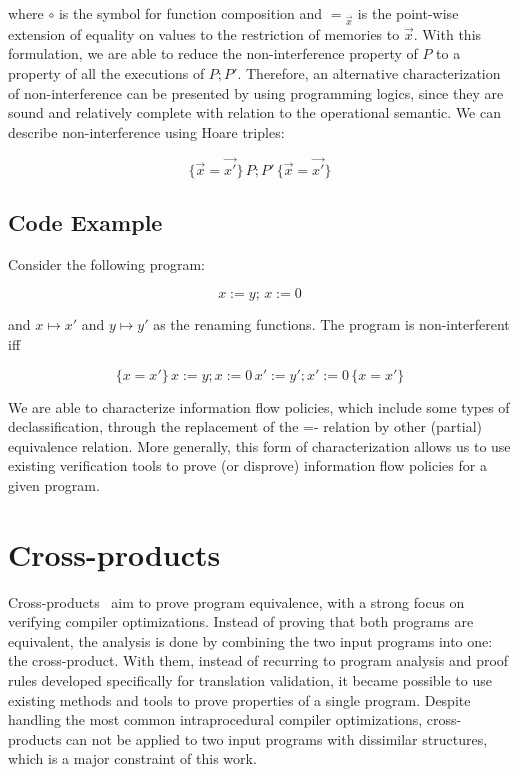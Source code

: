 where $\circ$ is the symbol for function composition and \(= {}_{\overrightarrow{x}}\) is the point-wise extension of equality on values to the restriction of memories to $\overrightarrow{x}$.
With this formulation, we are able to reduce the non-interference property of \(P\) to a property of all the executions of \(P; P'\).
Therefore, an alternative characterization of non-interference can be presented by using programming logics, since they are sound and relatively complete with relation to the operational semantic.
We can describe non-interference using Hoare triples:

\[ \{\overrightarrow{x} = \overrightarrow{x'}\} \, P; P' \, \{\overrightarrow{x} = \overrightarrow{x'}\} \]


\subsection{Code Example}
\label{subsec:self_composition_example}

Consider the following program:

\[ x := y; \, x := 0 \]

and \(x \mapsto x'\) and \(y \mapsto y'\) as the renaming functions. 
The program is non-interferent iff

\[ \{x = x'\} \, x := y; x := 0 \, x' := y'; x' := 0 \, \{x = x'\} \]

We are able to characterize information flow policies, which include some types of declassification, through the replacement of the =- relation by other (partial) equivalence relation.
More generally, this form of characterization allows us to use existing verification tools to prove (or disprove) information flow policies for a given program.


\section{Cross-products} 
\label{sec:cross_products}

Cross-products~\cite{DBLP:conf/fm/ZaksP08} aim to prove program equivalence, with a strong focus on verifying compiler optimizations.
Instead of proving that both programs are equivalent, the analysis is done by combining the two input programs into one: the cross-product.
With them, instead of recurring to program analysis and proof rules developed specifically for translation validation, it became possible to use existing methods and tools to prove properties of a single program. 
Despite handling the most common intraprocedural compiler optimizations, cross-products can not be applied to two input programs with dissimilar structures, which is a major constraint of this work.

